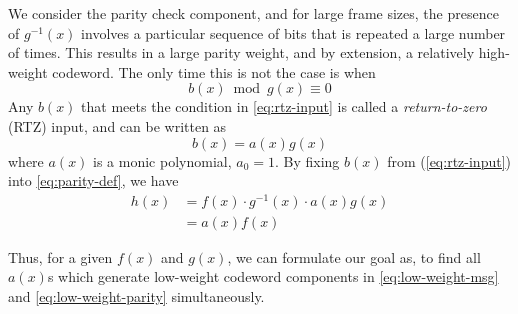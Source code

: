 We consider the parity check component, and for large frame sizes, the presence of $g^{-1}(x)$ involves a particular sequence of bits that is repeated a large number of times. This results in a large parity weight, and by extension, a relatively high-weight codeword. The only time this is not the case is when
\begin{equation}
b(x) \bmod g(x) \equiv 0
\label{eq:rtz-input}
\end{equation}
Any $b(x)$ that meets the condition in \eqref{eq:rtz-input} is called a \textit{return-to-zero} (RTZ) input, and can be written as 
\begin{equation}
b(x) =a(x)g(x)
\label{eq:low-weight-msg}
\end{equation}
where $a(x)$ is a monic polynomial, $a_0=1$.
By fixing $b(x)$ from (\ref{eq:rtz-input}) into \eqref{eq:parity-def}, we have 
\begin{equation}
\begin{split}
h(x)&=f(x)\cdot g^{-1}(x)\cdot a(x)g(x)\\
&=a(x)f(x)
\end{split}
\label{eq:low-weight-parity}
\end{equation}


Thus, for a given $f(x)$ and $g(x)$, we can formulate our goal as, to find all $a(x)$s which generate low-weight codeword components in  \eqref{eq:low-weight-msg} and  \eqref{eq:low-weight-parity} simultaneously. 



